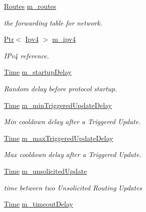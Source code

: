 \begin{DoxyCompactItemize}
\item 
\hyperlink{classns3_1_1Rip_a7108837a80349ce23ac60d043ac81d58}{Routes} \hyperlink{classns3_1_1Rip_aea6c918ae311cd88fb2bfb714d6f9c30}{m\+\_\+routes}
\begin{DoxyCompactList}\small\item\em the forwarding table for network. \end{DoxyCompactList}\item 
\hyperlink{classns3_1_1Ptr}{Ptr}$<$ \hyperlink{classns3_1_1Ipv4}{Ipv4} $>$ \hyperlink{classns3_1_1Rip_a6e2c0e74d2fa8643d223db26621dd7f1}{m\+\_\+ipv4}
\begin{DoxyCompactList}\small\item\em I\+Pv4 reference. \end{DoxyCompactList}\item 
\hyperlink{classns3_1_1Time}{Time} \hyperlink{classns3_1_1Rip_a26dfd4f6ce345b6259733027a77fbcc9}{m\+\_\+startup\+Delay}
\begin{DoxyCompactList}\small\item\em Random delay before protocol startup. \end{DoxyCompactList}\item 
\hyperlink{classns3_1_1Time}{Time} \hyperlink{classns3_1_1Rip_a9345ff42e947fb0edb2382d6c4f50bd0}{m\+\_\+min\+Triggered\+Update\+Delay}
\begin{DoxyCompactList}\small\item\em Min cooldown delay after a Triggered Update. \end{DoxyCompactList}\item 
\hyperlink{classns3_1_1Time}{Time} \hyperlink{classns3_1_1Rip_aed7be1d33584f7d7f8b2ca68bfbf3a06}{m\+\_\+max\+Triggered\+Update\+Delay}
\begin{DoxyCompactList}\small\item\em Max cooldown delay after a Triggered Update. \end{DoxyCompactList}\item 
\hyperlink{classns3_1_1Time}{Time} \hyperlink{classns3_1_1Rip_aabc5098465aa38f416c5daa7561d3ea0}{m\+\_\+unsolicited\+Update}
\begin{DoxyCompactList}\small\item\em time between two Unsolicited Routing Updates \end{DoxyCompactList}\item 
\hyperlink{classns3_1_1Time}{Time} \hyperlink{classns3_1_1Rip_a8a684a47271e0e382dd5f485a8a5545b}{m\+\_\+timeout\+Delay}

\end{DoxyCompactItemize}
